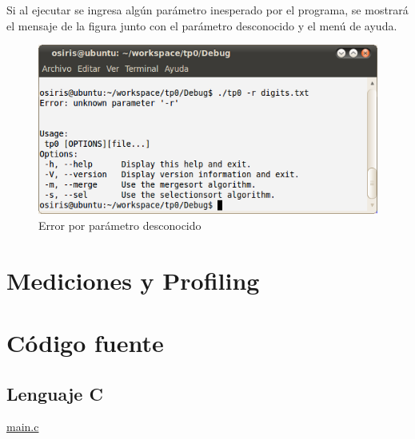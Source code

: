 \documentclass[a4paper,10pt]{article}
\begin{document}
Si al ejecutar se ingresa algún parámetro inesperado por el programa, se mostrará el mensaje de la figura junto con el parámetro desconocido y el menú de ayuda.\\
\begin{figure}[!htp]
	\centering
	\includegraphics[height=4.3 cm]{tp0_error_unknownparam.png}
	\caption{Error por parámetro desconocido}
	\label{Figura8}
\end{figure}

\newpage
\section{Mediciones y Profiling}

\newpage
\section{Código fuente}
\subsection{Lenguaje C}

\noindent
\underline{main.c}
\end{document}
